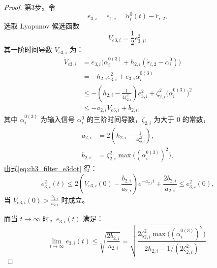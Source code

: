 \begin{proof}
第3步。令
\begin{equation}
e_{3,i}=\dot e_{1,i}=\ddot\alpha_i^0(t)-\ddot r_{i,2},
\end{equation}
选取 Lyapunov 候选函数
\begin{equation}
V_{e3,i}=\frac{1}{2}e_{3,i}^2,
\end{equation}
其一阶时间导数 $\dot V_{e3,i}$ 为：
\begin{equation}\label{eq:ch3_filter_e3dot}
\begin{aligned}
\dot V_{e3,i}
&=e_{3,i}\bigl(\alpha_i^{0(3)}+h_{2,i}(\dot r_{i,2}-\dot\alpha_i^0)\bigr)\\
&=-h_{2,i}e_{3,i}^2+e_{3,i}\alpha_i^{0(3)}\\
&\le -\left(h_{2,i}-\frac{1}{4\zeta_{2,i}^2}\right)e_{3,i}^2+\zeta_{2,i}^2\bigl(\alpha_i^{0(3)}\bigr)^2\\
&\le -a_{2,i}V_{e3,i}+b_{2,i},
\end{aligned}
\end{equation}
其中 $\alpha_i^{0(3)}$ 为输入信号 $\alpha_i^0$ 的三阶时间导数，$\zeta_{2,i}$ 为大于 0 的常数，
\begin{subequations}
\begin{align}
a_{2,i}&=2\left(h_{2,i}-\frac{1}{4\zeta_{2,i}^2}\right),\\
b_{2,i}&=\zeta_{2,i}^2\max\bigl((\alpha_i^{0(3)})^2\bigr),
\end{align}
\end{subequations}
由式\eqref{eq:ch3_filter_e3dot} 得：
\begin{equation}\label{eq:ch3_filter_e3bound}
e_{3,i}^2(t)\le
2\left(V_{e3,i}(0)-\frac{b_{2,i}}{a_{2,i}}\right)e^{-a_{2,i}t}+\frac{2b_{2,i}}{a_{2,i}}
\le e_{3,i}^2(0),
\end{equation}
当 $V_{e3,i}(0)>\frac{b_{2,i}}{a_{2,i}}$ 时成立。

而当 $t\to\infty$ 时，$e_{3,i}(t)$ 满足：
\begin{equation}\label{eq:ch3_filter_e3lim}
\lim_{t\to\infty}e_{3,i}(t)\le
\sqrt{\frac{2b_{2,i}}{a_{2,i}}}
=
\sqrt{\frac{2\zeta_{2,i}^2\max\bigl((\alpha_i^{0(3)})^2\bigr)}{2h_{2,i}-1/(2\zeta_{2,i}^2)}}.
\end{equation}


\end{proof}
